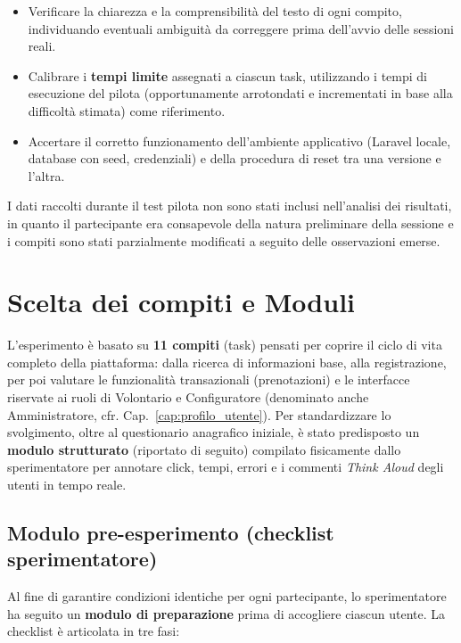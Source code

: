 \begin{itemize}
    \item Verificare la chiarezza e la comprensibilità del testo di ogni compito, individuando eventuali ambiguità da correggere prima dell'avvio delle sessioni reali.
    \item Calibrare i \textbf{tempi limite} assegnati a ciascun task, utilizzando i tempi di esecuzione del pilota (opportunamente arrotondati e incrementati in base alla difficoltà stimata) come riferimento.
    \item Accertare il corretto funzionamento dell'ambiente applicativo (Laravel locale, database con seed, credenziali) e della procedura di reset tra una versione e l'altra.
\end{itemize}

I dati raccolti durante il test pilota non sono stati inclusi nell'analisi dei risultati, in quanto il partecipante era consapevole della natura preliminare della sessione e i compiti sono stati parzialmente modificati a seguito delle osservazioni emerse.

\section{Scelta dei compiti e Moduli}

L'esperimento è basato su \textbf{11 compiti} (task) pensati per coprire il ciclo di vita completo della piattaforma: dalla ricerca di informazioni base, alla registrazione, per poi valutare le funzionalità transazionali (prenotazioni) e le interfacce riservate ai ruoli di Volontario e Configuratore (denominato anche Amministratore, cfr. Cap.~\ref{cap:profilo_utente}). 
Per standardizzare lo svolgimento, oltre al questionario anagrafico iniziale, è stato predisposto un \textbf{modulo strutturato} (riportato di seguito) compilato fisicamente dallo sperimentatore per annotare click, tempi, errori e i commenti \textit{Think Aloud} degli utenti in tempo reale.

\subsection{Modulo pre-esperimento (checklist sperimentatore)}

Al fine di garantire condizioni identiche per ogni partecipante, lo sperimentatore ha seguito un \textbf{modulo di preparazione} prima di accogliere ciascun utente. La checklist è articolata in tre fasi:

